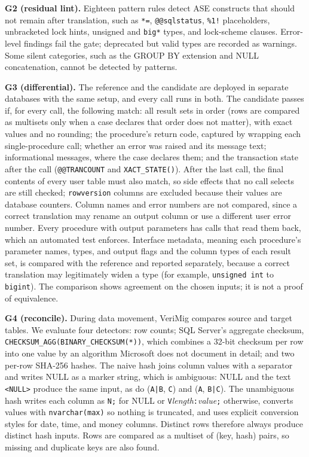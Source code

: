 \textbf{G2 (residual lint).} Eighteen pattern rules detect ASE constructs that should not remain after
translation, such as \texttt{*=}, \texttt{@@sqlstatus}, \texttt{\%1!} placeholders, unbracketed lock hints,
unsigned and \texttt{big*} types, and lock-scheme clauses. Error-level findings fail the gate; deprecated
but valid types are recorded as warnings. Some silent categories, such as the GROUP BY extension and NULL
concatenation, cannot be detected by patterns.

\textbf{G3 (differential).} The reference and the candidate are deployed in separate databases with the
same setup, and every call runs in both. The candidate passes if, for every call, the following match:
all result sets in order (rows are compared as multisets only when a case declares that order does not
matter), with exact values and no rounding; the procedure's return code, captured by wrapping each
single-procedure call; whether an error was raised and its message text; informational messages, where the
case declares them; and the transaction state after the call (\texttt{@@TRANCOUNT} and
\texttt{XACT\_STATE()}). After the last call, the final contents of every user table must also match, so
side effects that no call selects are still checked; \texttt{rowversion} columns are excluded because their
values are database counters. Column names and error numbers are not compared, since a correct translation
may rename an output column or use a different user error number. Every procedure with output parameters
has calls that read them back, which an automated test enforces. Interface metadata, meaning each
procedure's parameter names, types, and output flags and the column types of each result set, is compared
with the reference and reported separately, because a correct translation may legitimately widen a type
(for example, \texttt{unsigned int} to \texttt{bigint}). The comparison shows agreement on the chosen inputs; it is not a proof of
equivalence.

\textbf{G4 (reconcile).} During data movement, VeriMig compares source and target tables. We evaluate four
detectors: row counts; SQL Server's aggregate checksum, \texttt{CHECKSUM\_AGG(BINARY\_CHECKSUM(*))}, which
combines a 32-bit checksum per row into one value by an algorithm Microsoft does not document in detail;
and two per-row SHA-256 hashes. The naive hash joins column values with a separator and writes NULL as a
marker string, which is ambiguous: NULL and the text \texttt{<NULL>} produce the same input, as do
(\texttt{A|B}, \texttt{C}) and (\texttt{A}, \texttt{B|C}). The unambiguous hash writes each column as
\texttt{N;} for NULL or \texttt{V}\emph{length}\texttt{:}\emph{value}\texttt{;} otherwise, converts values
with \texttt{nvarchar(max)} so nothing is truncated, and uses explicit conversion styles for date, time,
and money columns. Distinct rows therefore always produce distinct hash inputs. Rows are compared as a
multiset of (key, hash) pairs, so missing and duplicate keys are also found.

